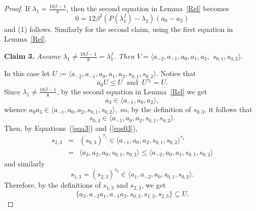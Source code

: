 \documentclass[a4paper]{amsart}
\newcommand{\lmu}{\lambda_1}
\newcommand{\lmf}{\lambda_1^f}
\newcommand{\lmd}{\lambda_2}
\newcommand{\bt}{\beta}
\begin{document}
\begin{proof}
If $\lmu= \frac{18\bt-1}{8}$, then the second equation in Lemma~\ref{Rel} becomes
$$
0=12\bt^2(P(\lmu^f)-\lmd)(a_0-a_2)
$$
and (1) follows.  Similarly for the second claim, using the first equation in Lemma~\ref{Rel}.

\medskip

{\bf Claim 3.} {\it Assume $\lmu\neq  \frac{18\bt-1}{8}=\lmf$. Then $V=\langle a_{-2}, a_{-1}, a_0, a_1, a_2, $ $s_{0,1}, s_{0,2} \rangle$}.
\medskip

In this case let $U:=\langle a_{-2}, a_{-1}, a_0, a_1, a_2, s_{0,1}, s_{0,2} \rangle$. Notice that
\begin{equation}\label{a0U1}
a_0U\leq U\:\mbox{ and }\: U^{\tau_0}=U.
\end{equation}
Since $\lmu\neq \frac{18\bt-1}{8}$, by the second equation in Lemma~\ref{Rel} we get 
\begin{equation}\label{eqa3}
a_{3}\in \langle a_{-1}, a_0, a_2\rangle,
\end{equation}
whence $a_0a_3\in \langle a_{-1}, a_0, a_2, s_{0,1}, s_{0,2} \rangle,$
so, by the definition of $s_{0,3}$, it follows that 
\begin{equation}\label{eqs03}
s_{0,3}\in \langle a_{-1}, a_0, a_2, s_{0,1}, s_{0,2} \rangle .
\end{equation}
Then, by Equations~(\ref{eqa3}) and (\ref{eqs03}), 
\begin{eqnarray*}
s_{2,3}&=&(s_{0,3})^{\tau_1}\in \langle a_{-1}, a_0, a_2, s_{0,1}, s_{0,2} \rangle^{\tau_1}\\
&=&\langle a_{3}, a_2, a_0, s_{0,1}, s_{0,2} \rangle \leq \langle a_{-2}, a_0, a_1, s_{0,1}, s_{0,2} \rangle
\end{eqnarray*}
and similarly
$$
s_{1,3}=(s_{2,3})^{\tau_0}\in \langle a_{1}, a_{-2}, a_0, s_{0,1}, s_{0,2} \rangle .
$$
Therefore, by the definitions of $s_{1,3}$ and $s_{2,3}$, we get
\begin{equation}\label{s13}
\{a_3, a_{-2}a_1, a_{-1}a_2, s_{0,3}, s_{1,3}, s_{2,3}\}\subseteq U.
\end{equation}


\end{proof}
\end{document}
